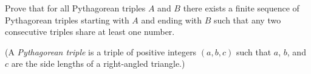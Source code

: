 \documentclass[10pt,a4paper]{scrartcl}
\begin{document}
	\begin{prob}%
	Prove that for all Pythagorean triples \(A\) and \(B\) there exists a finite sequence of Pythagorean triples starting with \(A\) and ending with \(B\) such that any two consecutive triples share at least one number.

 (A \emph{Pythagorean triple} is a triple of positive integers \((a, b, c)\) such that \(a\), \(b\), and \(c\) are the side lengths of a right-angled triangle.)
	\end{prob}
\end{document}
